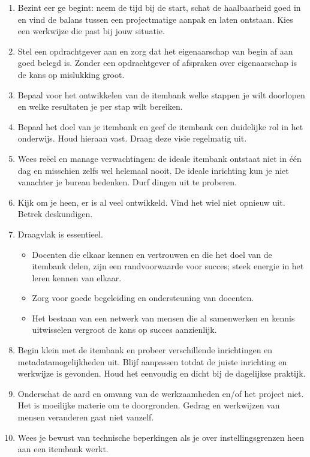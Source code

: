 \documentclass[
]{book}
\providecommand{\tightlist}{%
  \setlength{\itemsep}{0pt}\setlength{\parskip}{0pt}}
\begin{document}
\begin{enumerate}
\def\labelenumi{\arabic{enumi}.}
\tightlist
\item
  Bezint eer ge begint: neem de tijd bij de start, schat de haalbaarheid goed in en vind de balans tussen een projectmatige aanpak en laten ontstaan. Kies een werkwijze die past bij jouw situatie.
\item
  Stel een opdrachtgever aan en zorg dat het eigenaarschap van begin af aan goed belegd is. Zonder een opdrachtgever of afspraken over eigenaarschap is de kans op mislukking groot.
\item
  Bepaal voor het ontwikkelen van de itembank welke stappen je wilt doorlopen en welke resultaten je per stap wilt bereiken.
\item
  Bepaal het doel van je itembank en geef de itembank een duidelijke rol in het onderwijs. Houd hieraan vast. Draag deze visie regelmatig uit.
\item
  Wees reëel en manage verwachtingen: de ideale itembank ontstaat niet in één dag en misschien zelfs wel helemaal nooit. De ideale inrichting kun je niet vanachter je bureau bedenken. Durf dingen uit te proberen.
\item
  Kijk om je heen, er is al veel ontwikkeld. Vind het wiel niet opnieuw uit. Betrek deskundigen.
\item
  Draagvlak is essentieel.

  \begin{itemize}
  \tightlist
  \item
    Docenten die elkaar kennen en vertrouwen en die het doel van de itembank delen, zijn een randvoorwaarde voor succes; steek energie in het leren kennen van elkaar.
  \item
    Zorg voor goede begeleiding en ondersteuning van docenten.
  \item
    Het bestaan van een netwerk van mensen die al samenwerken en kennis uitwisselen vergroot de kans op succes aanzienlijk.
  \end{itemize}
\item
  Begin klein met de itembank en probeer verschillende inrichtingen en metadatamogelijkheden uit. Blijf aanpassen totdat de juiste inrichting en werkwijze is gevonden. Houd het eenvoudig en dicht bij de dagelijkse praktijk.
\item
  Onderschat de aard en omvang van de werkzaamheden en/of het project niet. Het is moeilijke materie om te doorgronden. Gedrag en werkwijzen van mensen veranderen gaat niet vanzelf.
\item
  Wees je bewust van technische beperkingen als je over instellingsgrenzen heen aan een itembank werkt.
\end{enumerate}
\end{document}

